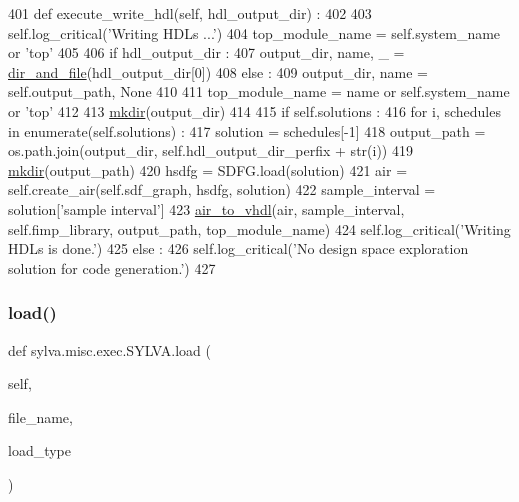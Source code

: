 \begin{DoxyCode}
401   \textcolor{keyword}{def }execute\_write\_hdl(self, hdl\_output\_dir) :
402 
403     self.log\_critical(\textcolor{stringliteral}{'Writing HDLs ...'})
404     top\_module\_name = self.system\_name \textcolor{keywordflow}{or} \textcolor{stringliteral}{'top'}
405 
406     \textcolor{keywordflow}{if} hdl\_output\_dir :
407       output\_dir, name, \_ = \hyperlink{namespacesylva_1_1misc_1_1util_a0ce6d1d719234031353b60ac60f2af0d}{dir\_and\_file}(hdl\_output\_dir[0])
408     \textcolor{keywordflow}{else} :
409       output\_dir, name = self.output\_path, \textcolor{keywordtype}{None}
410 
411     top\_module\_name = name \textcolor{keywordflow}{or} self.system\_name \textcolor{keywordflow}{or} \textcolor{stringliteral}{'top'}
412 
413     \hyperlink{namespacesylva_1_1misc_1_1util_af426e429c40209bbb46e3a0e8f139a44}{mkdir}(output\_dir)
414 
415     \textcolor{keywordflow}{if} self.solutions :
416       \textcolor{keywordflow}{for} i, schedules \textcolor{keywordflow}{in} enumerate(self.solutions) :
417         solution = schedules[-1]
418         output\_path = os.path.join(output\_dir, self.hdl\_output\_dir\_perfix + str(i))
419         \hyperlink{namespacesylva_1_1misc_1_1util_af426e429c40209bbb46e3a0e8f139a44}{mkdir}(output\_path)
420         hsdfg = SDFG.load(solution)
421         air = self.create\_air(self.sdf\_graph, hsdfg, solution)
422         sample\_interval = solution[\textcolor{stringliteral}{'sample interval'}]
423         \hyperlink{namespacesylva_1_1code__generation_1_1air_a12c49366c61395ad719575c8715849cc}{air\_to\_vhdl}(air, sample\_interval, self.fimp\_library, output\_path, top\_module\_name)
424       self.log\_critical(\textcolor{stringliteral}{'Writing HDLs is done.'})
425     \textcolor{keywordflow}{else} :
426       self.log\_critical(\textcolor{stringliteral}{'No design space exploration solution for code generation.'})
427 
\end{DoxyCode}
\mbox{\label{classsylva_1_1misc_1_1exec_1_1_s_y_l_v_a_a848ae0b83bbf7a02a22b2958dd1388f8}} 
\subsubsection{\texorpdfstring{load()}{load()}}
{\footnotesize\ttfamily def sylva.\+misc.\+exec.\+S\+Y\+L\+V\+A.\+load (\begin{DoxyParamCaption}\item[{}]{self,  }\item[{}]{file\+\_\+name,  }\item[{}]{load\+\_\+type }\end{DoxyParamCaption})}



